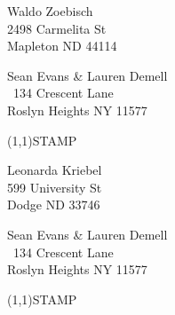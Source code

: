 \documentclass[12pt]{article}
\begin{document}
\begin{center} \begin{Huge} \vspace*{\fill}
Waldo Zoebisch\\
2498 Carmelita St\\
Mapleton ND 44114\\
\vspace{\fill} \end{Huge} \end{center}

\clearpage

\begin{minipage}{.5\linewidth} \noindent
Sean Evans \& Lauren Demell\\\ 
134 Crescent Lane\\ 
Roslyn Heights NY 11577
\end{minipage}
\begin{minipage}{.5\linewidth \hspace{-.2in} \vspace{-.3in}}
\begin{flushright}
\framebox(1,1){STAMP}
\end{flushright}
\end{minipage}

\begin{center} \begin{Huge} \vspace*{\fill}
Leonarda Kriebel\\
599 University St\\
Dodge ND 33746\\
\vspace{\fill} \end{Huge} \end{center}

\clearpage

\begin{minipage}{.5\linewidth} \noindent
Sean Evans \& Lauren Demell\\\ 
134 Crescent Lane\\ 
Roslyn Heights NY 11577
\end{minipage}
\begin{minipage}{.5\linewidth \hspace{-.2in} \vspace{-.3in}}
\begin{flushright}
\framebox(1,1){STAMP}
\end{flushright}
\end{minipage}
\end{document}
